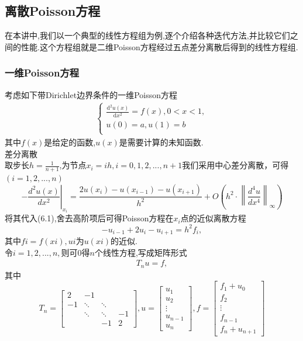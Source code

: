 \documentclass[12pt,a4paper]{article}
\begin{document}
\subsection{离散Poisson方程}
在本讲中,我们以一个典型的线性方程组为例,逐个介绍各种迭代方法,并比较它们之间的性能.这个方程组就是二维Poisson方程经过五点差分离散后得到的线性方程组.\\
\subsubsection{一维Poisson方程}
考虑如下带Dirichlet边界条件的一维Poisson方程
\begin{align}
\begin{cases}
	\frac{\mathrm{d^2} u(x)}{\mathrm{d}x^2} =f(x),0<x<1,\\
	u(0)=a,u(1) = b\\
\end{cases}
\tag{6.1}
\end{align}
其中$f(x)$是给定的函数,$u(x)$是需要计算的未知函数.\\
差分离散\\
取步长$h=\frac{1}{n+1}$,为节点$x_i=ih,i=0,1,2,...,n+1$我们采用中心差分离散，可得$(i=1,2,...,n)$
$$
-\left.\frac{d^{2} u(x)}{d x^{2}}\right|_{x_{i}}=\frac{2 u\left(x_{i}\right)-u\left(x_{i-1}\right)-u\left(x_{i+1}\right)}{h^{2}}+O\left(h^{2} \cdot\left\|\frac{d^{4} u}{d x^{4}}\right\|_{\infty}\right)
$$
将其代入(6.1),舍去高阶项后可得Poisson方程在$x_i$点的近似离散方程
$$\boxed{-u_{i-1}+2u_i-u_{i+1}=h^2f_i,}$$
其中$fi=f(xi),ui$为$u(xi)$的近似.\\
令$i= 1,2,...,n,$则可0得$n$个线性方程,写成矩阵形式
\begin{align}
{T_nu=f,}
\tag{6.2}
\end{align}
其中
\begin{equation}
T_{n}=\left[\begin{array}{cccc}{2} & {-1} & {} & {} \\ {-1} & {\ddots} & {\ddots} & {} \\ {} & {\ddots} & {\ddots} & {-1} \\ {} & {} & {-1} & {2}\end{array}\right], u=\left[\begin{array}{c}{u_{1}} \\ {u_{2}} \\ {\vdots} \\ {u_{n-1}} \\ {u_{n}}\end{array}\right], f=\left[\begin{array}{c}{f_{1}+u_{0}} \\ {f_{2}} \\ {\vdots} \\ {f_{n-1}} \\ {f_{n}+u_{n+1}}\end{array}\right]
\tag{6.3}
\end{equation}
\end{document}
